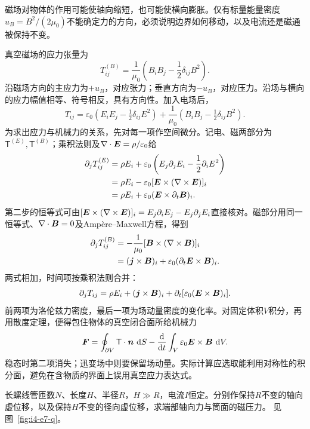磁场对物体的作用可能使轴向缩短，也可能使横向膨胀。仅有标量能量密度$u_B=B^2/(2\mu_0)$不能确定力的方向，必须说明边界如何移动，以及电流还是磁通被保持不变。

真空磁场的应力张量为
\[
T_{ij}^{(B)}=\frac1{\mu_0}\left(B_iB_j-\frac12\delta_{ij}B^2\right).
\]
沿磁场方向的主应力为$+u_B$，对应张力；垂直方向为$-u_B$，对应压力。沿场与横向的应力幅值相等、符号相反，具有方向性。加入电场后，
\[
T_{ij}=\varepsilon_0(E_iE_j-\tfrac12\delta_{ij}E^2)
+\frac1{\mu_0}(B_iB_j-\tfrac12\delta_{ij}B^2).
\]
为求出应力与机械力的关系，先对每一项作空间微分。记电、磁两部分为$\mathsf T^{(E)},\mathsf T^{(B)}$；乘积法则及$\nabla\cdot\bm{E}=\rho/\varepsilon_0$给
\[\begin{aligned}
\partial_jT_{ij}^{(E)}
&=\rho E_i+\varepsilon_0
\left(E_j\partial_jE_i-\frac12\partial_iE^2\right)\\
&=\rho E_i-\varepsilon_0[\bm{E}\times(\nabla\times\bm{E})]_i\\
&=\rho E_i+\varepsilon_0(\bm{E}\times\partial_t\bm{B})_i.
\end{aligned}\]
第二步的恒等式可由$[\bm{E}\times(\nabla\times\bm{E})]_i
=E_j\partial_iE_j-E_j\partial_jE_i$直接核对。磁部分用同一恒等式、$\nabla\cdot\bm{B}=0$及Ampère--Maxwell方程，得到
\[\begin{aligned}
\partial_jT_{ij}^{(B)}
&=-\frac1{\mu_0}[\bm{B}\times(\nabla\times\bm{B})]_i\\
&=(\bm{j}\times\bm{B})_i
+\varepsilon_0(\partial_t\bm{E}\times\bm{B})_i.
\end{aligned}\]
两式相加，时间项按乘积法则合并：
\[\partial_jT_{ij}=\rho E_i+(\bm{j}\times\bm{B})_i
+\partial_t[\varepsilon_0(\bm{E}\times\bm{B})_i].\]
前两项为洛伦兹力密度，最后一项为场动量密度的变化率。对固定体积$V$积分，再用散度定理，便得包住物体的真空闭合面所给机械力
\[
\bm{F}=\oint_{\partial V}\mathsf T\cdot\bm{n}\,\mathop{}\!\mathrm d S
-\frac{\mathop{}\!\mathrm d}{\mathop{}\!\mathrm d t}\int_V\varepsilon_0\bm{E}\times\bm{B}\,\mathop{}\!\mathrm d V.
\]
稳态时第二项消失；迅变场中则要保留场动量。实际计算应选取能利用对称性的积分面，避免在含物质的界面上误用真空应力表达式。


\begin{example}[长螺线管的轴向吸引与径向压力]\label{ex:i4-e7}

长螺线管匝数$N$、长度$H$、半径$R$，$H\gg R$，电流$I$恒定。分别作保持$R$不变的轴向虚位移，以及保持$H$不变的径向虚位移，求端部轴向力与筒面的磁压力。
 见图~\ref{fig:i4-e7-q}。
\end{example}

